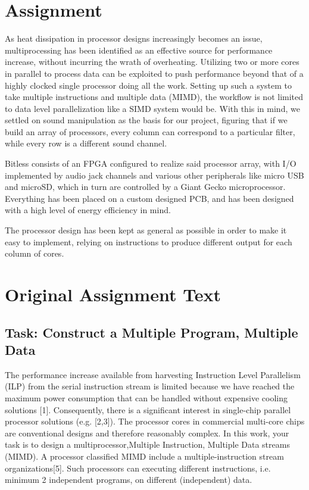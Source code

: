 \section{Assignment}

As heat dissipation in processor designs increasingly becomes an issue, multiprocessing has been identified as an effective source for performance increase, without incurring the wrath of overheating. Utilizing two or more cores in parallel to process data can be exploited to push performance beyond that of a highly clocked single processor doing all the work. Setting up such a system to take multiple instructions and multiple data (MIMD), the workflow is not limited to data level parallelization like a SIMD system would be. With this in mind, we settled on sound manipulation as the basis for our project, figuring that if we build an array of processors, every column can correspond to a particular filter, while every row is a different sound channel.
\newline

Bitless consists of an FPGA configured to realize said processor array, with I/O implemented by audio jack channels and various other peripherals like micro USB and microSD, which in turn are controlled by a Giant Gecko microprocessor. Everything has been placed on a custom designed PCB, and has been designed with a high level of energy efficiency in mind.
\newline

The processor design has been kept as general as possible in order to make it easy to implement, relying on instructions to produce different output for each column of cores.
\newline


\section{Original Assignment Text}

\subsection{Task: Construct a Multiple Program, Multiple Data}
The performance increase available from harvesting Instruction Level Parallelism (ILP) from the serial 
instruction stream is limited because we have reached the maximum power consumption that can be 
handled without expensive cooling solutions [1]. Consequently, there is a significant interest in 
single-chip parallel processor solutions (e.g. [2,3]). The processor cores in commercial multi-core 
chips are conventional designs and therefore reasonably complex. In this work, your task is to design 
a multiprocessor,Multiple Instruction, Multiple Data streams (MIMD). A processor classified MIMD 
include a multiple-instruction stream organizations[5]. Such processors can executing different 
instructions, i.e. minimum 2 independent programs, on different (independent) data. 
 
